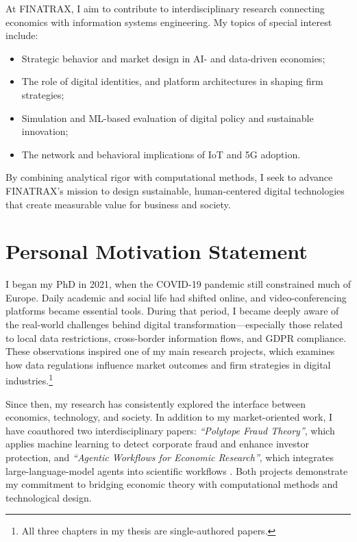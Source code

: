 \documentclass{nfr}
\begin{document}
At FINATRAX, I aim to contribute to interdisciplinary research connecting economics with information systems engineering. My topics of special interest include:
\begin{itemize}
    \item Strategic behavior and market design in AI- and data-driven economies;
    \item The role of digital identities, and platform architectures in shaping firm strategies;
    \item Simulation and ML-based evaluation of digital policy and sustainable innovation;
    \item The network and behavioral implications of IoT and 5G adoption.
\end{itemize}

By combining analytical rigor with computational methods, I seek to advance FINATRAX’s mission to design sustainable, human-centered digital technologies that create measurable value for business and society.

\section*{Personal Motivation Statement}


I began my PhD in 2021, when the COVID-19 pandemic still constrained much of Europe. Daily academic and social life had shifted online, and video-conferencing platforms became essential tools. During that period, I became deeply aware of the real-world challenges behind digital transformation—especially those related to local data restrictions, cross-border information flows, and GDPR compliance. These observations inspired one of my main research projects, which examines how data regulations influence market outcomes and firm strategies in digital industries.\footnote{All three chapters in my thesis are single-authored papers.}

Since then, my research has consistently explored the interface between economics, technology, and society. In addition to my market-oriented work, I have coauthored two interdisciplinary papers: \textit{“Polytope Fraud Theory”}, which applies machine learning to detect corporate fraud and enhance investor protection, and \textit{“Agentic Workflows for Economic Research”}, which integrates large-language-model agents into scientific workflows \citep{Dawid2025, Zhao2025}. Both projects demonstrate my commitment to bridging economic theory with computational methods and technological design.
\end{document}
